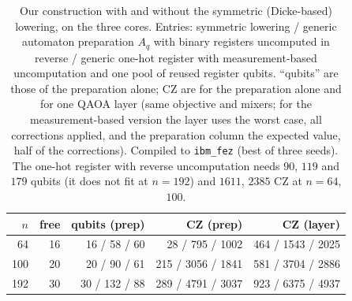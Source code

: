 \begin{table}[t]
\centering\footnotesize\setlength{\tabcolsep}{4pt}
\caption{ Our construction with and without the symmetric (Dicke-based) lowering, on the three cores. Entries: symmetric lowering / generic automaton preparation $A_q$ with binary registers uncomputed in reverse / generic one-hot register with measurement-based uncomputation and one pool of reused register qubits. ``qubits'' are those of the preparation alone; CZ are for the preparation alone and for one QAOA layer (same objective and mixers; for the measurement-based version the layer uses the worst case, all corrections applied, and the preparation column the expected value, half of the corrections). Compiled to \texttt{ibm\_fez} (best of three seeds). The one-hot register with reverse uncomputation needs $90$, $119$ and $179$ qubits (it does not fit at $n=192$) and $1611$, $2385$ CZ at $n=64$, $100$.}\label{tab:core_generic}
\begin{tabular}{rrrrr}
\toprule
$n$ & free & qubits (prep) & CZ (prep) & CZ (layer)\\
\midrule
64 & 16 & 16 / 58 / 60 & 28 / 795 / 1002 & 464 / 1543 / 2025\\
100 & 20 & 20 / 90 / 61 & 215 / 3056 / 1841 & 581 / 3704 / 2886\\
192 & 30 & 30 / 132 / 88 & 289 / 4791 / 3037 & 923 / 6375 / 4937\\
\bottomrule
\end{tabular}
\end{table}
